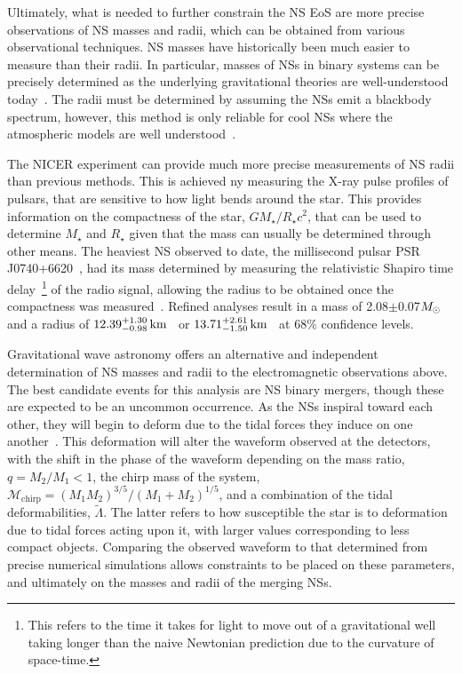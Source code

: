 Ultimately, what is needed to further constrain the NS EoS are more precise observations of NS masses and radii, which can be obtained from various observational techniques. NS masses have historically been much easier to measure than their radii. In particular, masses of NSs in binary systems can be precisely determined as the underlying gravitational theories are well-understood today~\cite{Steiner:2010fz_Equationstateobserved, Lattimer:2013hma_Neutronstarmasses, Ozel:2015fia_Densematterequation,Ozel:2016oaf_jul_MassesRadiiEquation, Miller:2016pom_Observationalconstraintsneutron}. The radii must be determined by assuming the NSs emit a blackbody spectrum, however, this method is only reliable for cool NSs where the atmospheric models are well understood~\cite{Miller:2016pom_Observationalconstraintsneutron}. 

The NICER experiment can provide much more precise measurements of NS radii than previous methods. This is achieved ny measuring the X-ray pulse profiles of pulsars, that are sensitive to how light bends around the star. This provides information on the compactness of the star, $G M_\star/R_\star c^2$, that can be used to determine $M_\star$ and $R_\star$ given that the mass can usually be determined through other means. The heaviest NS observed to date, the millisecond pulsar PSR J0740+6620~\cite{Miller:2021qha_sep_RadiusPSRJ0740, Riley:2021pdl_sep_NICERViewMassive}, had its mass determined by measuring the relativistic Shapiro time delay~\cite{Shapiro:1964uw_FourthTestGeneral}\footnote{This refers to the time it takes for light to move out of a gravitational well taking longer than the naive Newtonian prediction due to the curvature of space-time.} of the radio signal, allowing the radius to be obtained once the compactness was measured~\cite{NANOGrav:2019jur_sep_RelativisticShapirodelay}. Refined analyses result in a mass of 2.08$\pm$0.07$M_\odot$~\cite{Fonseca:2021wxt_jul_RefinedMassGeometric} and a radius of $12.39^{+1.30}_{-0.98} {\rm \,km}$~\cite{Riley:2021pdl_sep_NICERViewMassive} or $13.71^{+2.61}_{-1.50} {\rm \,km}$~\cite{Miller:2021qha_sep_RadiusPSRJ0740} at 68\% confidence levels. 


Gravitational wave astronomy offers an alternative and independent determination of NS masses and radii to the electromagnetic observations above. The best candidate events for this analysis are NS binary mergers, though these are expected to be an uncommon occurrence. As the NSs inspiral toward each other, they will begin to deform due to the tidal forces they induce on one another~\cite{Lattimer:2019eez_jun_NeutronStarMass}. 
This deformation will alter the waveform observed at the detectors, with the shift in the phase of the waveform depending on the mass ratio, $q = M_2/M_1 <1$, the chirp mass of the system, $\mathcal{M}_\mathrm{chirp} = (M_1 M_2)^{3/5}/(M_1 + M_2)^{1/5}$, and a combination of the tidal deformabilities, $\tilde\Lambda$. The latter refers to how susceptible the star is to deformation due to tidal forces acting upon it, with larger values corresponding to less compact objects. Comparing the observed waveform to that determined from precise numerical simulations allows constraints to be placed on these parameters, and ultimately on the masses and radii of the merging NSs.

